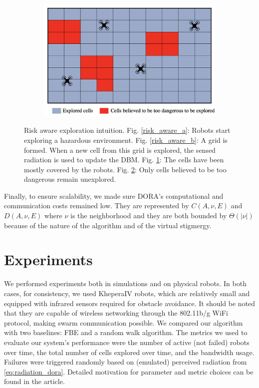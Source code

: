 \begin{figure}[htbp]
\begin{subfigure}{0.45\textwidth}
         \caption{}
         \label{risk_aware_c}
    \end{subfigure}
    \begin{subfigure}{0.45\textwidth}
         \centering
         \includegraphics[width=\textwidth]{figures/dora_explorer/risk_aware_d.png}
         \caption{}
         \label{risk_aware_d}
    \end{subfigure}
        \caption[Risk-aware exploration intuition]{Risk aware exploration intuition. Fig. \ref{risk_aware_a}: Robots start exploring a hazardous environment. Fig. \ref{risk_aware_b}: A grid is formed. When a new cell from this grid is explored, the sensed radiation is used to update the \ac{DBM}. Fig. \ref{risk_aware_c}: The cells have been mostly covered by the robots. Fig. \ref{risk_aware_d}: Only cells believed to be too dangerous remain unexplored.}
    \label{risk_aware}
\end{figure}

Finally, to ensure scalability, we made sure \ac{DORA}'s computational and communication costs remained low. They are represented by $C(A, \nu, E)$ and $D(A, \nu, E)$ where $\nu$ is the neighborhood and they are both bounded by $\Theta(|\nu|)$ because of the nature of the algorithm and of the virtual stigmergy.

\section{Experiments}
We performed experiments both in simulations and on physical robots. In both cases, for consistency, we used KheperaIV \cite{kteam2021kheperaiv} robots, which are relatively small and equipped with infrared sensors required for obstacle avoidance. It should be noted that they are capable of wireless networking through the 802.11b/g WiFi protocol, making swarm communication possible. We compared our algorithm with two baselines: \ac{FBE} and a random walk algorithm. The metrics we used to evaluate our system's performance were the number of active (not failed) robots over time, the total number of cells explored over time, and the bandwidth usage. Failures were triggered randomly based on (emulated) perceived radiation from \eqref{eq:radiation_dora}. Detailed motivation for parameter and metric choices can be found in the article.

